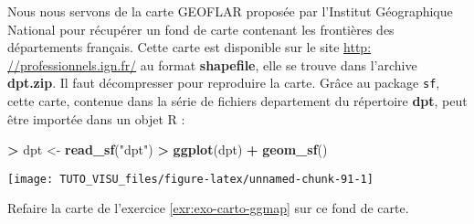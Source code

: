 \documentclass[]{book}
\newenvironment{Shaded}{\begin{snugshade}}{\end{snugshade}}
\newcommand{\DataTypeTok}[1]{\textcolor[rgb]{0.13,0.29,0.53}{#1}}
\newcommand{\DecValTok}[1]{\textcolor[rgb]{0.00,0.00,0.81}{#1}}
\newcommand{\ErrorTok}[1]{\textcolor[rgb]{0.64,0.00,0.00}{\textbf{#1}}}
\newcommand{\KeywordTok}[1]{\textcolor[rgb]{0.13,0.29,0.53}{\textbf{#1}}}
\newcommand{\NormalTok}[1]{#1}
\newcommand{\OperatorTok}[1]{\textcolor[rgb]{0.81,0.36,0.00}{\textbf{#1}}}
\newcommand{\StringTok}[1]{\textcolor[rgb]{0.31,0.60,0.02}{#1}}
\theoremstyle{definition}
\theoremstyle{definition}
\theoremstyle{definition}
\theoremstyle{remark}
\let\BeginKnitrBlock\begin \let\EndKnitrBlock\end
\begin{document}
\BeginKnitrBlock{exercise}[Première carte avec sf]
\protect\hypertarget{exr:exo-carto-sf1}{}{\label{exr:exo-carto-sf1} \iffalse (Première carte avec sf) \fi{} }
\EndKnitrBlock{exercise}

Nous nous servons de la carte GEOFLAR proposée par l'Institut Géographique National pour récupérer un fond de carte contenant les frontières des départements français. Cette carte est disponible sur le site \href{http:\%20//professionnels.ign.fr/}{http: //professionnels.ign.fr/} au format \textbf{shapefile}, elle se trouve dans l'archive \textbf{dpt.zip}. Il faut décompresser pour reproduire la carte. Grâce au package \texttt{sf}, cette carte, contenue dans la série de fichiers departement du répertoire \textbf{dpt}, peut être importée dans un objet R :

\begin{Shaded}
\begin{Highlighting}[]
\OperatorTok{>}\StringTok{ }\NormalTok{dpt <-}\StringTok{ }\KeywordTok{read_sf}\NormalTok{(}\StringTok{"dpt"}\NormalTok{)}
\OperatorTok{>}\StringTok{ }\KeywordTok{ggplot}\NormalTok{(dpt) }\OperatorTok{+}\StringTok{ }\KeywordTok{geom_sf}\NormalTok{()}
\end{Highlighting}
\end{Shaded}

\begin{center}\texttt{[image: TUTO\_VISU\_files/figure-latex/unnamed-chunk-91-1]} \end{center}

Refaire la carte de l'exercice \ref{exr:exo-carto-ggmap} sur ce fond de carte.

\begin{Shaded}
\end{Shaded}
\end{document}
